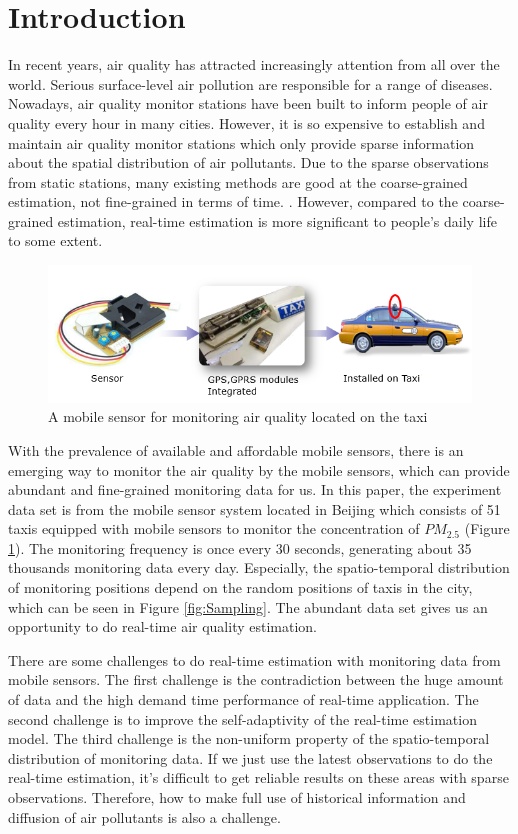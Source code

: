 \documentclass[twoside,leqno,twocolumn]{article}
\begin{document}
\section{Introduction}
\noindent In recent years, air quality has attracted increasingly attention from all over the world. Serious surface-level air pollution are responsible for a range of diseases. Nowadays, air quality monitor stations have been built to inform people of air quality every hour in many cities. However, it is so expensive to establish and maintain air quality monitor stations which only provide sparse information about the spatial distribution of air pollutants. Due to the sparse observations from static stations, many existing methods are good at the coarse-grained estimation, not fine-grained in terms of time. \cite{Hsieh2015Inferring} \cite{Grover2015A}. However, compared to the coarse-grained estimation, real-time estimation is more significant to people's daily life to some extent\cite{Zhang2012Real}.
\begin{figure}[tbp]
\centerline{
\includegraphics[width=0.9\linewidth]{pictures/equipment.png}
}
\caption{\label{fig:equipment}A mobile sensor for monitoring air quality located on the taxi}
\end{figure}

With the prevalence of available and affordable mobile sensors, there is an emerging way to monitor the air quality by the mobile sensors, which can provide abundant and fine-grained monitoring data for us. In this paper, the experiment data set is from the mobile sensor system located in Beijing which consists of 51 taxis equipped with mobile sensors to monitor the concentration of $PM_{2.5}$ (Figure \ref{fig:equipment}). The monitoring frequency is once every 30 seconds, generating about 35 thousands monitoring data every day. Especially, the spatio-temporal distribution of monitoring positions depend on the random positions of taxis in the city, which can be seen in Figure \ref{fig:Sampling}. The abundant data set gives us an opportunity to do real-time air quality estimation.

There are some challenges to do real-time estimation with monitoring data from mobile sensors. The first challenge is the contradiction between the huge amount of data and the high demand time performance of real-time application. The second challenge is to improve the self-adaptivity of the real-time estimation model. The third challenge is the non-uniform property of the spatio-temporal distribution of monitoring data. If we just use the latest observations to do the real-time estimation, it's difficult to get reliable results on these areas with sparse observations. Therefore, how to make full use of historical information and diffusion of air pollutants is also a challenge.
\end{document}
